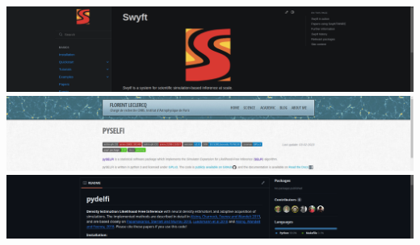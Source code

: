 \documentclass[aspectratio=169]{beamer}
\begin{document}
\begin{frame}
\begin{columns}
        \includegraphics[width=\textwidth]{figures/swyft_screenshot}
        \includegraphics[width=\textwidth]{figures/selfi_screenshot}
        \includegraphics[width=\textwidth]{figures/delfi_screenshot}
    \end{columns}
\end{frame}
\end{document}
